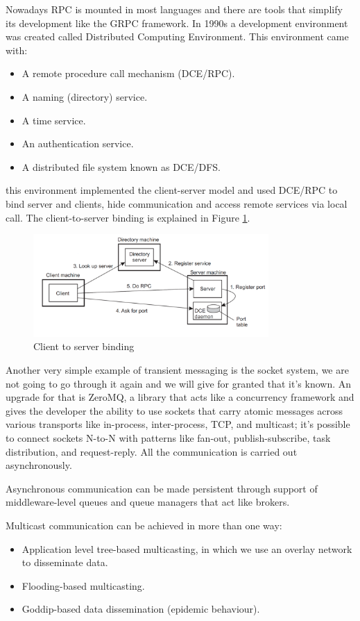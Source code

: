 Nowadays RPC is mounted in most languages and there are tools that simplify its development like the GRPC framework. In 1990s a development environment was created called Distributed Computing Environment. This environment came with:
\begin{itemize}
    \item A remote procedure call mechanism (DCE/RPC).
    \item A naming (directory) service.
    \item A time service.
    \item An authentication service.
    \item A distributed file system known as DCE/DFS.
\end{itemize}
this environment implemented the client-server model and used DCE/RPC to bind server and clients, hide communication and access remote services via local call. The client-to-server binding is explained in Figure \ref{fig:client_server_binding}.
\begin{figure}
    \centering
    \includegraphics[width=0.8\textwidth]{img/Client_server_binding_DCE.png}
    \caption{Client to server binding}
    \label{fig:client_server_binding}
\end{figure}
Another very simple example of transient messaging is the socket system, we are not going to go through it again and we will give for granted that it's known. An upgrade for that is ZeroMQ, a library that acts like a concurrency framework and gives the developer the ability to use sockets that carry atomic messages across various transports like in-process, inter-process, TCP, and multicast; it's possible to connect sockets N-to-N with patterns like fan-out, publish-subscribe, task distribution, and request-reply. All the communication is carried out asynchronously.

Asynchronous communication can be made persistent through support of middleware-level queues and queue managers that act like brokers.

Multicast communication can be achieved in more than one way:
\begin{itemize}
    \item Application level tree-based multicasting, in which we use an overlay network to disseminate data.
    \item Flooding-based multicasting.
    \item Goddip-based data dissemination (epidemic behaviour).
\end{itemize}
